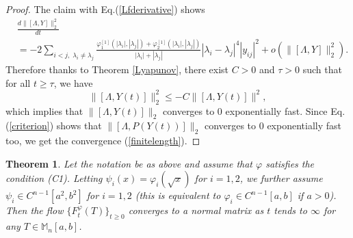 \documentclass[12pt]{article}
\newtheorem{theorem}{Theorem}[section]
\theoremstyle{definition}
\numberwithin{equation}{section}
\newcommand{\M}{\mathbb{M}}
\begin{document}
\begin{proof}
The claim with Eq.(\ref{Lfderivative}) shows 
\begin{align*}
 &\frac{d\|[\Lambda,Y]\|_2^2}{dt} \\
 &=-2\sum_{i<j,\;\lambda_i\neq \lambda_j}
	\frac{\varphi^{[1]}_1(|\lambda_i|,|\lambda_j|)+\varphi^{[1]}_2(|\lambda_i|,|\lambda_j|)}{|\lambda_i|+|\lambda_j|}
	|\lambda_i-\lambda_j|^4|y_{ij}|^2+o(\|[\Lambda,Y]\|_2^2). 
\end{align*}
Therefore thanks to Theorem \ref{Lyapunov}, there exist $C>0$ and $\tau>0$ such that for all $t\geq \tau$, we have 
\[\|[\Lambda,Y(t)]\|_2^2\leq -C\|[\Lambda,Y(t)]\|^2,\] 
which implies that  $\|[\Lambda,Y(t)]\|_2$ converges to 0 exponentially fast. 
Since Eq.(\ref{criterion}) shows that $\|[\Lambda,P(Y(t))]\|_2$ converges to 0 exponentially fast too, 
we get the convergence (\ref{finitelength}). 
\end{proof}


\begin{theorem}\label{Cn-1}
Let the notation be as above and assume that 
$\varphi$ satisfies the condition (C1). 
Letting $\psi_i(x)=\varphi_i(\sqrt{x})$ for $i=1,2$, we further assume $\psi_i\in C^{n-1}[a^2,b^2]$ for $i=1,2$ 
(this is equivalent to $\varphi_i\in C^{n-1}[a,b]$ if $a> 0$). 
Then the flow $\{F^\varphi_t(T)\}_{t\geq 0}$ converges to a normal matrix 
as $t$ tends to $\infty$ for any $T\in \M_n[a,b]$.  
\end{theorem}
\end{document}
